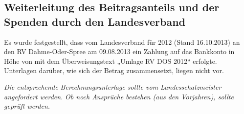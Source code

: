 \documentclass[%
	titlepage,oneside,12pt,headlines=1.5,numbers=noenddot, chapterprefix=false,parskip=full-,DIV=14,pagesize]{scrreprt}
\begin{document}
\subsection{Weiterleitung des Beitragsanteils und der Spenden durch den Landesverband}
Es wurde festgestellt, dass vom Landesverband für 2012 (Stand 16.10.2013) an den RV Dahme-Oder-Spree am 09.08.2013 ein Zahlung auf das Bankkonto in Höhe von  mit dem Überweisungstext „Umlage RV DOS 2012“ erfolgte. Unterlagen darüber, wie sich der Betrag zusammensetzt, liegen nicht vor.

\textit{Die entsprechende Berechnungsunterlage sollte vom Landesschatzmeister angefordert werden.} \textit{Ob noch Ansprüche bestehen (aus den Vorjahren), sollte geprüft werden.}

\pagebreak
\end{document}
